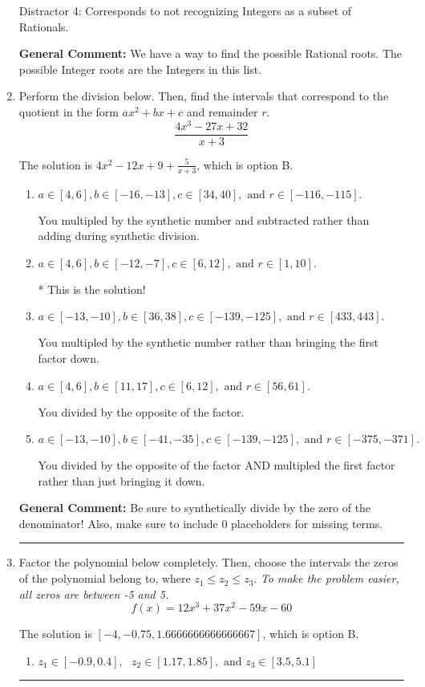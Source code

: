 \documentclass{extbook}[14pt]
\newcommand{\litem}[1]{\item #1

\rule{\textwidth}{0.4pt}}
\begin{document}
\begin{enumerate}
{\begin{enumerate}[label=\Alph*.]
 Distractor 4: Corresponds to not recognizing Integers as a subset of Rationals.
\end{enumerate}

\textbf{General Comment:} We have a way to find the possible Rational roots. The possible Integer roots are the Integers in this list.
}
\litem{
Perform the division below. Then, find the intervals that correspond to the quotient in the form $ax^2+bx+c$ and remainder $r$.
\[ \frac{4x^{3} -27 x + 32}{x + 3} \]

The solution is \( 4x^{2} -12 x + 9 + \frac{5}{x + 3} \), which is option B.\begin{enumerate}[label=\Alph*.]
\item \( a \in [4, 6], b \in [-16, -13], c \in [34, 40], \text{ and } r \in [-116, -115]. \)

 You multipled by the synthetic number and subtracted rather than adding during synthetic division.
\item \( a \in [4, 6], b \in [-12, -7], c \in [6, 12], \text{ and } r \in [1, 10]. \)

* This is the solution!
\item \( a \in [-13, -10], b \in [36, 38], c \in [-139, -125], \text{ and } r \in [433, 443]. \)

 You multipled by the synthetic number rather than bringing the first factor down.
\item \( a \in [4, 6], b \in [11, 17], c \in [6, 12], \text{ and } r \in [56, 61]. \)

 You divided by the opposite of the factor.
\item \( a \in [-13, -10], b \in [-41, -35], c \in [-139, -125], \text{ and } r \in [-375, -371]. \)

 You divided by the opposite of the factor AND multipled the first factor rather than just bringing it down.
\end{enumerate}

\textbf{General Comment:} Be sure to synthetically divide by the zero of the denominator! Also, make sure to include 0 placeholders for missing terms.
}
\litem{
Factor the polynomial below completely. Then, choose the intervals the zeros of the polynomial belong to, where $z_1 \leq z_2 \leq z_3$. \textit{To make the problem easier, all zeros are between -5 and 5.}
\[ f(x) = 12x^{3} +37 x^{2} -59 x -60 \]

The solution is \( [-4, -0.75, 1.6666666666666667] \), which is option B.\begin{enumerate}[label=\Alph*.]
\item \( z_1 \in [-0.9, 0.4], \text{   }  z_2 \in [1.17, 1.85], \text{   and   } z_3 \in [3.5, 5.1] \)


\end{enumerate}}
\end{enumerate}
\end{document}

